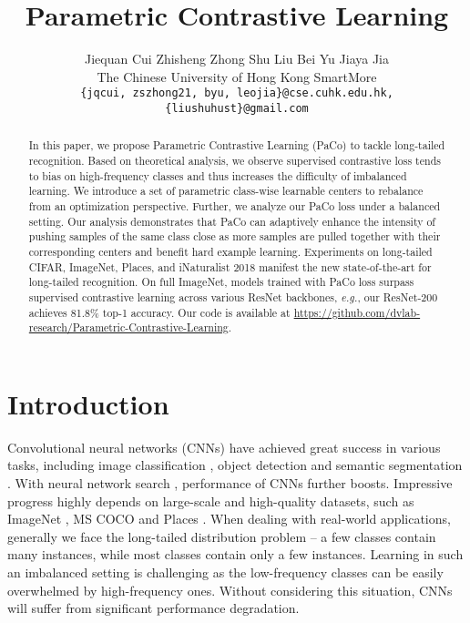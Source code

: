 \documentclass[10pt,twocolumn,letterpaper]{article}
\begin{document}
\title{Parametric Contrastive Learning}
\author{
	Jiequan Cui  \quad 
	Zhisheng Zhong  \quad
	Shu Liu  \quad
	Bei Yu  \quad
	Jiaya Jia  \\
	The Chinese University of Hong Kong \hspace{1cm} SmartMore \hspace{1cm} 
    \vspace{.7em}\\
	{\tt\small \{jqcui, zszhong21, byu, leojia\}@cse.cuhk.edu.hk, \{liushuhust\}@gmail.com}
}

\maketitle
\ificcvfinal\thispagestyle{empty}\fi



\begin{abstract}
	In this paper, we propose Parametric Contrastive Learning (PaCo) to tackle long-tailed recognition. Based on theoretical analysis, we observe supervised contrastive loss tends to bias on high-frequency classes and thus increases the difficulty of imbalanced learning. We introduce a set of parametric class-wise learnable centers to rebalance from an optimization perspective. Further, we analyze our PaCo loss under a balanced setting. Our analysis demonstrates that PaCo can adaptively enhance the intensity of pushing samples of the same class close as more samples are pulled together with their corresponding centers and benefit hard example learning. Experiments on long-tailed CIFAR, ImageNet, Places, and iNaturalist 2018 manifest the new state-of-the-art for long-tailed recognition. On full ImageNet, models trained with PaCo loss surpass supervised contrastive learning across various ResNet backbones, {\it e.g.}, our ResNet-200 achieves 81.8\% top-1 accuracy. Our code is available at \url{https://github.com/dvlab-research/Parametric-Contrastive-Learning}.
\end{abstract}

\section{Introduction}
Convolutional neural networks (CNNs) have achieved great success in various tasks, including image classification \cite{he2016deep,vggnet}, object detection \cite{DBLP:conf/cvpr/LinDGHHB17, DBLP:conf/cvpr/LiuQQSJ18} and semantic segmentation \cite{DBLP:conf/cvpr/ZhaoSQWJ17}. With neural network search \cite{DBLP:conf/cvpr/ZophVSL18, DBLP:conf/iclr/LiuSY19, DBLP:conf/cvpr/TanCPVSHL19, DBLP:conf/iccv/CuiCLLSJ19, DBLP:conf/iclr/CaiGWZH20}, performance of CNNs further boosts. Impressive progress highly depends on large-scale and high-quality datasets, such as ImageNet \cite{imagenet}, MS COCO \cite{coco} and Places \cite{zhou2017places}. When dealing with real-world applications, generally we face the long-tailed distribution problem -- a few classes contain many instances, while most classes contain only a few instances. Learning in such an imbalanced setting is challenging as the low-frequency classes can be easily overwhelmed by high-frequency ones. Without considering this situation, CNNs will suffer from significant performance degradation. 
\end{document}

